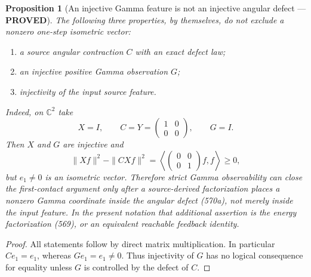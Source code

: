 \documentclass[11pt]{article}
\newtheorem{proposition}[theorem]{Proposition}
\newcommand{\PROVED}{\textcolor{green!45!black}{\textbf{PROVED}}}
\begin{document}
\begin{proposition}[An injective Gamma feature is not an injective angular
defect --- \PROVED]
The following three properties, by themselves, do not exclude a nonzero
one-step isometric vector:
\begin{enumerate}
\item a source angular contraction \(C\) with an exact defect law;
\item an injective positive Gamma observation \(G\);
\item injectivity of the input source feature.
\end{enumerate}
Indeed, on \(\mathbb C^2\) take
\begin{equation}
 X=I,\qquad C=Y=\begin{pmatrix}1&0\\0&0\end{pmatrix},
 \qquad G=I.                                         \tag{570m}
\end{equation}
Then \(X\) and \(G\) are injective and
\[
 \|Xf\|^2-\|CXf\|^2
 =\left\langle
   \begin{pmatrix}0&0\\0&1\end{pmatrix}f,f
  \right\rangle\ge0,
\]
but \(e_1\ne0\) is an isometric vector.  Therefore strict Gamma
observability can close the first-contact argument only after a
source-derived factorization places a nonzero Gamma coordinate inside the
\emph{angular defect} (570a), not merely inside the input feature.  In the
present notation that additional assertion is the energy factorization
(569), or an equivalent reachable feedback identity.
\end{proposition}

\begin{proof}
All statements follow by direct matrix multiplication.  In particular
\(Ce_1=e_1\), whereas \(Ge_1=e_1\ne0\).  Thus injectivity of \(G\) has no
logical consequence for equality unless \(G\) is controlled by the defect
of \(C\).
\end{proof}
\end{document}
